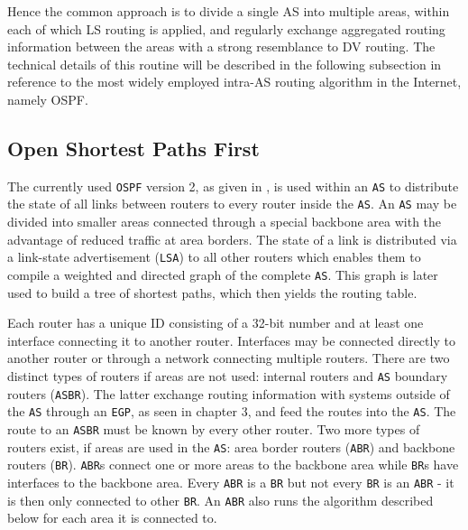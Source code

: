 \documentclass{acm_proc_article-sp}
\begin{document}
Hence the common approach is to divide a single AS into multiple areas, within each of which LS routing is applied, and regularly exchange aggregated routing information between the areas with a strong resemblance to DV routing. The technical details of this routine will be described in the following subsection in reference to the most widely employed intra-AS routing algorithm in the Internet, namely OSPF.

\subsection{Open Shortest Paths First}

The currently used \texttt{OSPF} version 2, as given in \cite{RFC1247}, is used within an \texttt{AS} to distribute the state of all links between routers to every router inside the \texttt{AS}. An \texttt{AS} may be divided into smaller areas connected through a special backbone area with the advantage of reduced traffic at area borders. The state of a link is distributed via a link-state advertisement (\texttt{LSA}) to all other routers which enables them to compile a weighted and directed graph of the complete \texttt{AS}. This graph is later used to build a tree of shortest paths, which then yields the routing table.


Each router has a unique ID consisting of a 32-bit number and at least one interface connecting it to another router. Interfaces may be connected directly to another router or through a network connecting multiple routers. There are two distinct types of routers if areas are not used: internal routers and \texttt{AS} boundary routers (\texttt{ASBR}). The latter exchange routing information with systems outside of the \texttt{AS} through an \texttt{EGP}, as seen in chapter 3, and feed the routes into the \texttt{AS}. The route to an \texttt{ASBR} must be known by every other router. Two more types of routers exist, if areas are used in the \texttt{AS}: area border routers (\texttt{ABR}) and backbone routers (\texttt{BR}). \texttt{ABR}s connect one or more areas to the backbone area while \texttt{BR}s have interfaces to the backbone area. Every \texttt{ABR} is a \texttt{BR} but not every \texttt{BR} is an \texttt{ABR} - it is then only connected to other \texttt{BR}. An \texttt{ABR} also runs the algorithm described below for each area it is connected to.
\end{document}
